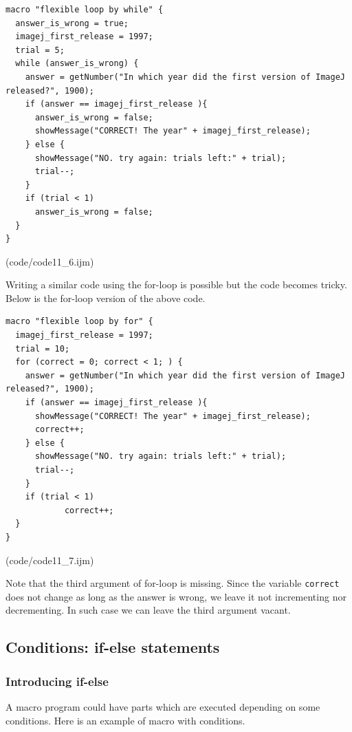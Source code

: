 \documentclass[11pt,a4paper,oneside]{report}
\newcommand{\ilcom}[1]{\texttt{\small#1}}
\begin{document}
\begin{lstlisting}[morekeywords={*, while}]
macro "flexible loop by while" {
  answer_is_wrong = true;
  imagej_first_release = 1997;
  trial = 5;
  while (answer_is_wrong) {
    answer = getNumber("In which year did the first version of ImageJ released?", 1900);
    if (answer == imagej_first_release ){
      answer_is_wrong = false;
      showMessage("CORRECT! The year" + imagej_first_release);		
    } else {
      showMessage("NO. try again: trials left:" + trial);
      trial--;
    }
    if (trial < 1)
      answer_is_wrong = false;
  }
}
\end{lstlisting}
(code/code11_6.ijm)

Writing a similar code using the for-loop is possible but the code becomes tricky.
Below is the for-loop version of the above code.  


\begin{lstlisting}[morekeywords={*, for}]
macro "flexible loop by for" {
  imagej_first_release = 1997;
  trial = 10;
  for (correct = 0; correct < 1; ) {
    answer = getNumber("In which year did the first version of ImageJ released?", 1900);
    if (answer == imagej_first_release ){
      showMessage("CORRECT! The year" + imagej_first_release);		
      correct++;
    } else {
      showMessage("NO. try again: trials left:" + trial);
      trial--;
    }
    if (trial < 1)
            correct++;
  }
}

\end{lstlisting}
(code/code11_7.ijm)

Note that the third argument of for-loop is missing. Since the variable
\ilcom{correct} does not change as long as the answer is wrong, we leave it not
incrementing nor decrementing. In such case we can leave the third argument
vacant. 

\subsection{Conditions: if-else statements}
\subsubsection{Introducing if-else}
A macro program could have parts which are executed depending on some
conditions.
Here is an example of macro with conditions.
\end{document}
